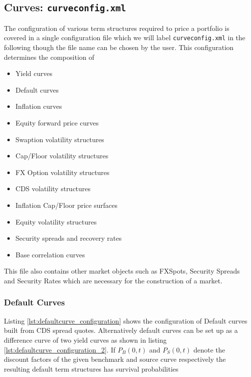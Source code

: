 \documentclass[12pt, a4paper]{article}
\begin{document}
\subsection{Curves: {\tt curveconfig.xml}}\label{sec:curveconfig}

The configuration of various term structures required to price a portfolio is covered in a single configuration file
which we will label {\tt curveconfig.xml} in the following though the file name can be chosen by the user. This
configuration determines the composition of 
\begin{itemize}
\item Yield curves %
\item Default curves %
\item Inflation curves %
\item Equity forward price curves %
\item Swaption volatility structures %
\item Cap/Floor volatility structures %
\item FX Option volatility structures %
\item CDS volatility structures %
\item Inflation Cap/Floor price surfaces %
\item Equity volatility structures %
\item Security spreads and recovery rates %
\item Base correlation curves %
\end{itemize}

This file also contains other market objects such as FXSpots, Security Spreads and Security Rates which are necessary
for the construction of a market.
 


\subsubsection{Default Curves}

Listing \ref{lst:defaultcurve_configuration} shows the configuration of Default curves built from CDS spread
quotes. Alternatively default curves can be set up as a difference curve of two yield curves as shown in listing
\ref{lst:defaultcurve_configuration_2}. If $P_B(0,t)$ and $P_S(0,t)$ denote the discount factors of the given benchmark
and source curve respectively the resulting default term structures has survival probabilities
\end{document}
